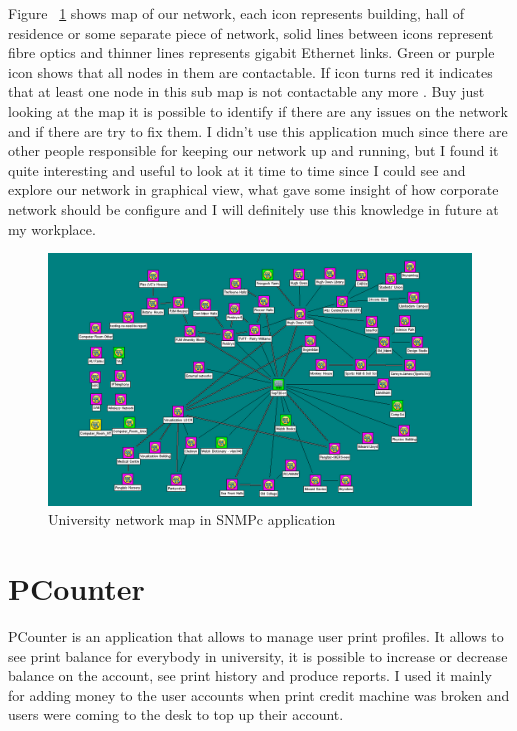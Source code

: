 \documentclass[10pt,a4paper,headinclude=true]{report}
\begin{document}
Figure ~\ref{fig:SNMPc_main} shows map of our network, each icon represents building, hall of residence or some separate piece of network, solid lines between icons represent fibre optics and thinner lines represents gigabit Ethernet links. Green or purple icon shows that all nodes in them are contactable. If icon turns red it indicates that at least one node in this sub map is not contactable any more \cite{SNPMcSharePoint}. Buy just looking at the map it is possible to identify if there are any issues on the network and if there are try to fix them. I didn't use this application much since there are other people responsible for keeping our network up and running, but I found it quite interesting and useful to look at it time to time since I could see and explore our network in graphical view, what gave some insight of how corporate network should be configure and I will definitely use this knowledge in future at my workplace.

\begin{figure}[H]
\centering
\centerline{\includegraphics[scale=0.5]{./SNMPc_main}}
\caption{University network map in SNMPc application}
\label{fig:SNMPc_main}
\end{figure}

\section{PCounter}
PCounter is an application that allows to  manage user print profiles. It allows to see print balance for everybody in university, it is possible to increase or decrease balance on the account, see print history and produce reports. I used it mainly for adding money to the user accounts when print credit machine was broken and users were coming to the desk to top up their account.
\end{document}
